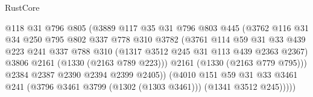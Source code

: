 \begin{lexlean}{RustCore}
\begin{coremodule}
{\begin{coremodule}
{{{{{{{{                                      @118
                                      @31
                                      @796
                                      @805
                                      (@3889
                                        @117
                                        @35
                                        @31
                                        @796
                                        @803
                                        @445
                                        (@3762
                                          @116
                                          @31
                                          @34
                                          @250
                                          @795
                                          @802
                                          @337
                                          @778
                                          @310
                                          @3782
                                          (@3761
                                            @114
                                            @59
                                            @31
                                            @33
                                            @439
                                            @223
                                            @241
                                            @337
                                            @788
                                            @310
                                            (@1317 @3512 @245 @31 @113 @439 @2363 @2367)
                                            @3806
                                            @2161
                                            (@1330 (@2163 @789 @223)))
                                          @2161
                                          (@1330 (@2163 @779 @795)))
                                        @2384
                                        @2387
                                        @2390
                                        @2394
                                        @2399
                                        @2405))
                                    (@4010
                                      @151
                                      @59
                                      @31
                                      @33
                                      @3461
                                      @241
                                      (@3796 @3461 @3799 (@1302 (@1303 @3461)))
                                      (@1341 @3512 @245)))))
}}}}}}}}
\end{coremodule}}
\end{coremodule}
\end{lexlean}
